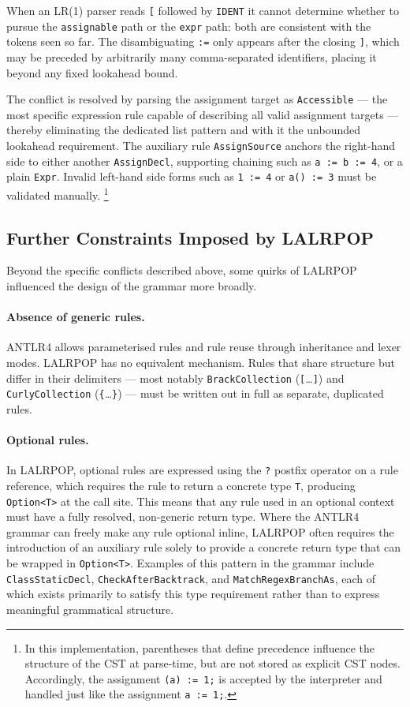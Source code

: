 When an LR(1) parser reads \texttt{[} followed by \texttt{IDENT} it cannot determine whether to pursue the \texttt{assignable} path or the \texttt{expr} path: both are consistent with the tokens seen so far. The disambiguating \texttt{:=} only appears after the closing \texttt{]}, which may be preceded by arbitrarily many comma-separated identifiers, placing it beyond any fixed lookahead bound.

The conflict is resolved by parsing the assignment target as \texttt{Accessible} --- the most specific expression rule capable of describing all valid assignment targets --- thereby eliminating the dedicated list pattern and with it the unbounded lookahead requirement. The auxiliary rule \texttt{AssignSource} anchors the right-hand side to either another \texttt{AssignDecl}, supporting chaining such as \texttt{a := b := 4}, or a plain \texttt{Expr}. Invalid left-hand side forms such as \texttt{1 := 4} or \texttt{a() := 3} must be validated manually.
\footnote{In this implementation, parentheses that define precedence influence the structure of the \ac{CST} at parse-time, but are not stored as explicit \ac{CST} nodes. Accordingly, the assignment \texttt{(a) := 1;} is accepted by the interpreter and handled just like the assignment \texttt{a := 1;}.}

\subsection{Further Constraints Imposed by LALRPOP}

Beyond the specific conflicts described above, some quirks of LALRPOP influenced the design of the grammar more broadly.

\paragraph{Absence of generic rules.}
ANTLR4 allows parameterised rules and rule reuse through inheritance and lexer modes. LALRPOP has no equivalent mechanism. Rules that share structure but differ in their delimiters --- most notably \texttt{BrackCollection} (\texttt{[}\ldots\texttt{]}) and \texttt{CurlyCollection} (\texttt{\{}\ldots\texttt{\}}) --- must be written out in full as separate, duplicated rules.

\paragraph{Optional rules.}
In LALRPOP, optional rules are expressed using the \texttt{?} postfix operator on a rule reference, which requires the rule to return a concrete type \texttt{T}, producing \texttt{Option<T>} at the call site. This means that any rule used in an optional context must have a fully resolved, non-generic return type. Where the ANTLR4 grammar can freely make any rule optional inline, LALRPOP often requires the introduction of an auxiliary rule solely to provide a concrete return type that can be wrapped in \texttt{Option<T>}. Examples of this pattern in the grammar include \texttt{ClassStaticDecl}, \texttt{CheckAfterBacktrack}, and \texttt{MatchRegexBranchAs}, each of which exists primarily to satisfy this type requirement rather than to express meaningful grammatical structure.

